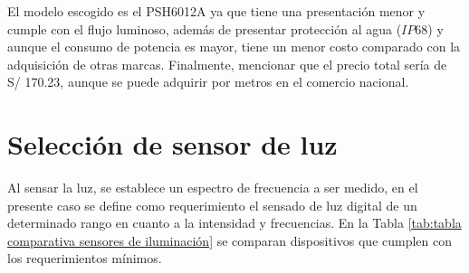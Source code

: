 El modelo escogido es el PSH6012A ya que tiene una presentación menor y cumple con el flujo luminoso, además de presentar protección al agua ($IP68$) y aunque el consumo de potencia es mayor, tiene un menor costo comparado con la adquisición de otras marcas. Finalmente, mencionar que el precio total sería de S/ 170.23, aunque se puede adquirir por metros en el comercio nacional.

\section{Selección de sensor de luz}

Al sensar la luz, se establece un espectro de frecuencia a ser medido, en el presente caso se define como requerimiento el sensado de luz digital de un determinado rango en cuanto a la intensidad y frecuencias. En la Tabla \ref{tab:tabla comparativa sensores de iluminación} se comparan dispositivos que cumplen con los requerimientos mínimos.

